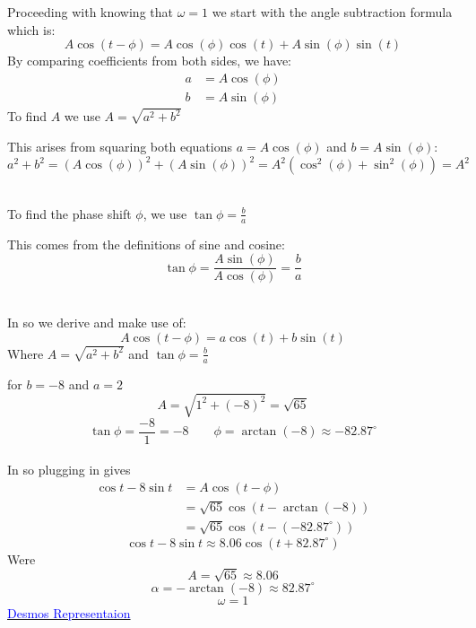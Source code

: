 \documentclass[a4paper, 12pt]{report}
\begin{document}
    \centering
    \begin{minipage}{0.53\textwidth}\centering
        Proceeding with knowing that $\omega = 1$ we start with
        the angle subtraction formula which is:
        \[A \cos(t - \phi) = A \cos(\phi) \cos(t) + A \sin(\phi) \sin(t)\]
        By comparing coefficients from both sides, we have:
        \begin{align*}
            a & = A \cos(\phi) \\
            b & = A \sin(\phi)
        \end{align*}
        To find $A$ we use $A = \sqrt{a^2 + b^2}$\\
        \begin{minipage}{1\textwidth}\centering
            This arises from squaring both equations \(a = A \cos(\phi)\) and \(b = A \sin(\phi)\):\\[1em]
            $a^2 + b^2 = (A \cos(\phi))^2 + (A \sin(\phi))^2 = A^2 (\cos^2(\phi) + \sin^2(\phi)) = A^2$
        \end{minipage}\\
        
        \vspace{1em}
        To find the phase shift \(\phi\), we use $\tan \phi = \frac{b}{a}$\\
        \begin{minipage}{1\textwidth}\centering
            This comes from the definitions of sine and cosine:
            \[\tan \phi = \frac{A \sin(\phi)}{A \cos(\phi)} = \frac{b}{a}\]
        \end{minipage}\\
        \vspace{1em}
        In so we derive and make use of:
        \[A \cos(t - \phi) = a \cos(t) + b \sin(t)\]
        Where $A = \sqrt{a^2 + b^2}$ and $\tan \phi = \frac{b}{a}$
    \end{minipage}\hfil
    \begin{minipage}{0.4\textwidth}\centering 
    for $b=-8$ and $a=2$
    \[A = \sqrt{1^2 + (-8)^2} = \sqrt{65}\]
    \[\tan \phi = \frac{-8}{1}=-8 \qquad \phi = \arctan(-8) \approx -82.87^\circ\]\\[6pt]
    In so plugging in gives
    \begin{align*}
    \cos t-8 \sin t &= A \cos(t - \phi)\\
    &= \sqrt{65} \cos(t - \arctan(-8))\\
    &= \sqrt{65} \cos(t - (-82.87^\circ))   
    \end{align*}
    \[\boxed{\cos t-8 \sin t \approx  8.06 \cos(t + 82.87^\circ)}\]
    Were
    \[A = \sqrt{65} \approx 8.06\]
    \[\alpha = -\arctan(-8) \approx 82.87^\circ\]
    \[\omega = 1\]    
    \href{https://www.desmos.com/calculator/mlmdfkdmsq}{\textcolor{blue}{Desmos Representaion}}
    \end{minipage}
\end{document}
